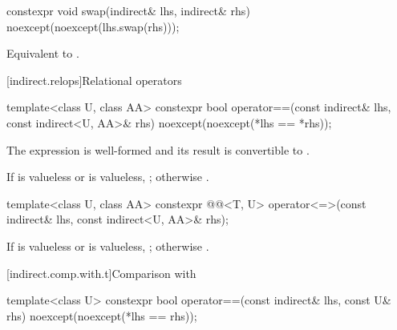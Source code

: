 %
\begin{itemdecl}
constexpr void swap(indirect& lhs, indirect& rhs) noexcept(noexcept(lhs.swap(rhs)));
\end{itemdecl}

\begin{itemdescr}
\pnum
\effects
Equivalent to .
\end{itemdescr}

[indirect.relops]{Relational operators}

%
\begin{itemdecl}
template<class U, class AA>
  constexpr bool operator==(const indirect& lhs, const indirect<U, AA>& rhs)
    noexcept(noexcept(*lhs == *rhs));
\end{itemdecl}

\begin{itemdescr}
\pnum
\mandates
The expression  is well-formed and
its result is convertible to .

\pnum
\returns
If  is valueless or  is valueless,
;
otherwise .
\end{itemdescr}

%
\begin{itemdecl}
template<class U, class AA>
  constexpr @@<T, U>
    operator<=>(const indirect& lhs, const indirect<U, AA>& rhs);
\end{itemdecl}

\begin{itemdescr}
\pnum
\returns
If  is valueless or  is valueless,
;
otherwise
.
\end{itemdescr}

[indirect.comp.with.t]{Comparison with }

%
\begin{itemdecl}
template<class U>
  constexpr bool operator==(const indirect& lhs, const U& rhs) noexcept(noexcept(*lhs == rhs));
\end{itemdecl}

